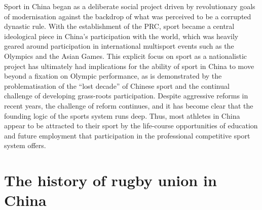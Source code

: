 \begin{CJK}{UTF8}{gbsn}
Sport in China began as a deliberate social project driven by revolutionary goals of modernisation against the backdrop of what was perceived to be a corrupted dynastic rule.  With the establishment of the PRC, sport became a central ideological piece in China's participation with the world, which was heavily geared around participation in international multisport events such as the Olympics and the Asian Games. This explicit focus on sport as a nationalistic project has ultimately had implications for the ability of sport in China to move beyond a fixation on Olympic performance, as is demonstrated by the problematisation of the ``lost decade'' of Chinese sport and the continual challenge of developing grass-roots participation.  Despite aggressive reforms in recent years, the challenge of reform continues, and it has become clear that the founding logic of the sports system runs deep.  Thus, most athletes in China appear to be attracted to their sport by the life-course opportunities of education and future employment that participation in the professional competitive sport system offers.










  \section{The history of rugby union in China}




\end{CJK}
